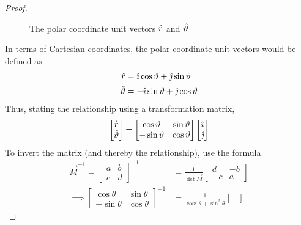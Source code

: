 \begin{lemma}
\begin{proof}
\begin{figure}
\begin{center}
            \end{center}
            \caption{The polar coordinate unit vectors $\hat{r}$ and $\hat{\vartheta}$}
            \label{figure:POLAR}
        \end{figure}
        In terms of Cartesian coordinates, the polar coordinate unit vectors would be defined as
        \begin{align*}
            \hat{r}&=\hat{\imath}\cos\vartheta+\hat{\jmath}\sin\vartheta\\
            \hat{\vartheta}&=-\hat{\imath}\sin\vartheta+\hat{\jmath}\cos\vartheta
        \end{align*}
        Thus, stating the relationship using a transformation matrix,
        $$
            \begin{bmatrix}
                \hat{r}\\
                \hat{\vartheta}
            \end{bmatrix}=\begin{bmatrix}
                \cos\vartheta&\sin\vartheta\\
                -\sin\vartheta&\cos\vartheta
            \end{bmatrix}\begin{bmatrix}
                \hat{\imath}\\
                \hat{\jmath}
            \end{bmatrix}
        $$
        To invert the matrix (and thereby the relationship), use the formula
        \begin{align*}
            \vec{M}^{-1}=\begin{bmatrix}
                a&b\\
                c&d
            \end{bmatrix}^{-1}&=\frac{1}{\det\vec{M}}\begin{bmatrix}
                d&-b\\
                -c&a
            \end{bmatrix}\\
            \implies\begin{bmatrix}
                \cos\theta&\sin\theta\\
                -\sin\theta&\cos\theta
            \end{bmatrix}^{-1}&=\frac{1}{\cos^2\theta+\sin^2\theta}\begin{bmatrix}

\end{bmatrix}
\end{align*}
\end{proof}
\end{lemma}
